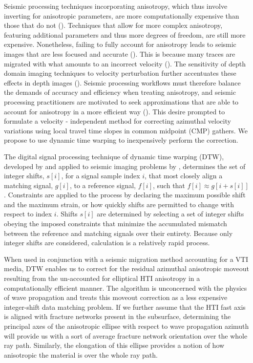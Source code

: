 Seismic processing techniques incorporating anisotropy, which thus involve inverting for anisotropic parameters, are more computationally expensive than those that do not (\citealp{alkhalifah-1996}).  Techniques that allow for more complex anisotropy, featuring additional parameters and thus more degrees of freedom, are still more expensive.  Nonetheless, failing to fully account for anisotropy leads to seismic images that are less focused and accurate (\citealp{helbig-2005}).  This is because many traces are migrated with what amounts to an incorrect velocity (\citealp{alkhalifah-1994,thomsen-2001}).  The sensitivity of depth domain imaging techniques to velocity perturbation further accentuates these effects in depth images (\citealp{tsvankin-2010}).  Seismic processing workflows must therefore balance the demands of accuracy and efficiency when treating anisotropy, and seismic processing practitioners are motivated to seek approximations that are able to account for anisotropy in a more efficient way (\citealp{helbig-2005,tsvankin-2010}). This desire prompted \cite{burnett-2009} to formulate a velocity - independent method for correcting azimuthal velocity variations using local travel time slopes in common midpoint (CMP) gathers.  
We propose to use dynamic time warping to inexpensively perform the correction.

The digital signal processing technique of dynamic time warping (DTW), developed by \cite{sakoe-1978} and applied to seismic imaging problems by \cite{hale-2013}, determines the set of integer shifts, $s [i ]$, for a signal sample index $i$, that most closely align a matching signal, $g [ i ]$, to a reference signal, $f [ i ]$, such that $f [ i ] \approx g [ i+s [ i ] ]$.  Constraints are applied to the process by declaring the maximum possible shift and the maximum strain, or how quickly shifts are permitted to change with respect to index $i$.   Shifts $s [i ]$ are determined by selecting a set of integer shifts obeying the imposed constraints that minimize the accumulated mismatch between the reference and matching signals over their entirety.  Because only integer shifts are considered, calculation  
is a relatively rapid process.

When used in conjunction with a seismic migration method accounting for a VTI media, DTW enables us to correct for the residual azimuthal anisotropic moveout resulting from the un-accounted for elliptical HTI anisotropy in a computationally efficient manner. The algorithm is unconcerned with the physics of wave propagation and treats this moveout correction as a less expensive integer-shift data matching problem.  If we further assume that the HTI fast axis is aligned with fracture networks present in the subsurface, determining the principal axes of the anisotropic ellipse with respect to wave propagation azimuth will provide us with a sort of average fracture network orientation over the whole ray path.  Similarly, the elongation of this ellipse provides a notion of how anisotropic the material is over the whole ray path.

